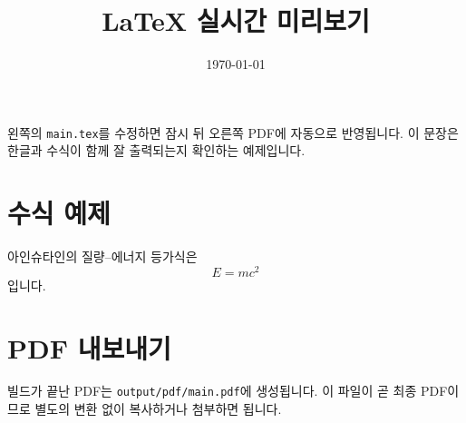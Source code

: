 \documentclass[11pt,a4paper]{article}
\title{LaTeX 실시간 미리보기}
\author{}
\date{\today}
\begin{document}
\maketitle

왼쪽의 \texttt{main.tex}를 수정하면 잠시 뒤 오른쪽 PDF에 자동으로 반영됩니다.
이 문장은 한글과 수식이 함께 잘 출력되는지 확인하는 예제입니다.

\section{수식 예제}

아인슈타인의 질량--에너지 등가식은
\[
  E = mc^2
\]
입니다.

\section{PDF 내보내기}

빌드가 끝난 PDF는 \texttt{output/pdf/main.pdf}에 생성됩니다. 이 파일이 곧 최종
PDF이므로 별도의 변환 없이 복사하거나 첨부하면 됩니다.
\end{document}
